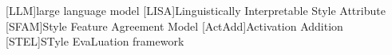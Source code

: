 
\begin{acronym}[ActAdd] %
  [LLM]{large language model}
  [LISA]{Linguistically Interpretable Style Attribute}
  [SFAM]{Style Feature Agreement Model}
  [ActAdd]{Activation Addition}
  [STEL]{STyle EvaLuation framework}
\end{acronym}